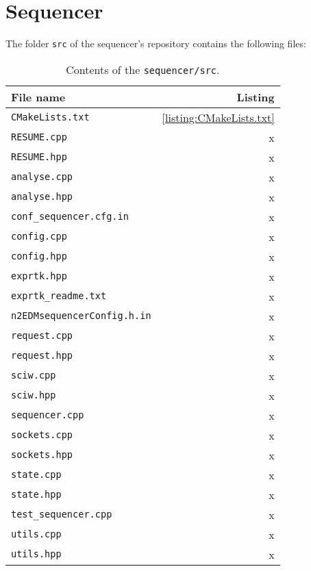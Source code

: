 \chapter{Sequencer}
\label{appendix:sequencer}

The folder \texttt{src} of the sequencer's repository contains the following files:
\begin{table}[h]
\centering
\begin{tabular}{|l|r|}
	\hline
	File name & Listing \\
	\hline \hline
	\texttt{CMakeLists.txt} & \ref{listing:CMakeLists.txt} \\
	\hline
	\texttt{RESUME.cpp} & x \\
	\hline
	\texttt{RESUME.hpp} & x \\
	\hline
	\texttt{analyse.cpp} & x \\
	\hline
	\texttt{analyse.hpp} & x \\
	\hline
	\texttt{conf\_sequencer.cfg.in} & x \\
	\hline
	\texttt{config.cpp} & x \\
	\hline
	\texttt{config.hpp} & x \\
	\hline
	\texttt{exprtk.hpp} & x \\
	\hline
	\texttt{exprtk\_readme.txt} & x \\
	\hline
	\texttt{n2EDMsequencerConfig.h.in} & x \\
	\hline
	\texttt{request.cpp} & x \\
	\hline
	\texttt{request.hpp} & x \\
	\hline
	\texttt{sciw.cpp} & x \\
	\hline
	\texttt{sciw.hpp} & x \\
	\hline
	\texttt{sequencer.cpp} & x \\
	\hline
	\texttt{sockets.cpp} & x \\
	\hline
	\texttt{sockets.hpp} & x \\
	\hline
	\texttt{state.cpp} & x \\
	\hline
	\texttt{state.hpp} & x \\
	\hline
	\texttt{test\_sequencer.cpp} & x \\
	\hline
	\texttt{utils.cpp} & x \\
	\hline
	\texttt{utils.hpp} & x \\
	\hline
\end{tabular}
\caption{Contents of the \texttt{sequencer/src}.}
\end{table}

